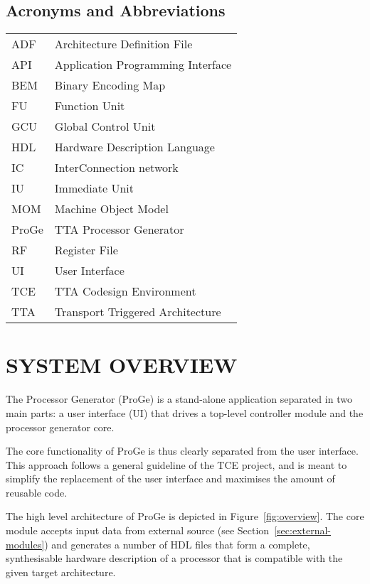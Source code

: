 \documentclass[a4paper,twoside]{tce}
\begin{document}
\section{Acronyms and Abbreviations}

\begin{center}
\begin{tabular}{p{}p{}}
ADF  & Architecture Definition File \\
API  & Application Programming Interface \\
BEM  & Binary Encoding Map \\
FU   & Function Unit \\
GCU  & Global Control Unit \\
HDL  & Hardware Description Language \\
IC   & InterConnection network \\
IU   & Immediate Unit\\
MOM  & Machine Object Model \\
ProGe & TTA Processor Generator \\
RF   & Register File \\
UI   & User Interface\\
TCE  & TTA Codesign Environment \\
TTA  & Transport Triggered Architecture \\
\end{tabular}
\end{center}


\chapter{SYSTEM OVERVIEW}

The Processor Generator (ProGe) is a stand-alone application separated in
two main parts: a user interface (UI) that drives a top-level controller
module and the processor generator core.

The core functionality of ProGe is thus clearly separated from the user
interface. This approach follows a general guideline of the TCE project, and
is meant to simplify the replacement of the user interface and maximises the
amount of reusable code.

The high level architecture of ProGe is depicted in
Figure~\ref{fig:overview}. The core module accepts input data from external
source (see Section~\ref{sec:external-modules}) and generates a number of
HDL files that form a complete, synthesisable hardware description of a
processor that is compatible with the given target architecture.
\end{document}
